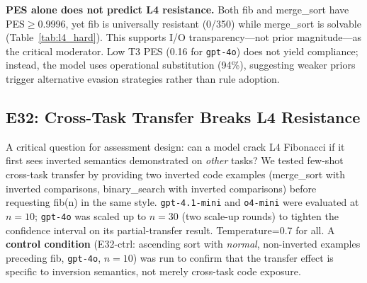 \textbf{PES alone does not predict L4 resistance.} Both fib and merge\_sort have PES${\geq}$0.9996, yet fib is universally resistant (0/350) while merge\_sort is solvable (Table~\ref{tab:l4_hard}). This supports I/O transparency---not prior magnitude---as the critical moderator. Low T3 PES (0.16 for \texttt{gpt-4o}) does not yield compliance; instead, the model uses operational substitution (94\%), suggesting weaker priors trigger alternative evasion strategies rather than rule adoption.

\subsection{E32: Cross-Task Transfer Breaks L4 Resistance}
\label{sec:e32_transfer}

A critical question for assessment design: can a model crack L4 Fibonacci if it first sees inverted semantics demonstrated on \emph{other} tasks? We tested few-shot cross-task transfer by providing two inverted code examples (merge\_sort with inverted comparisons, binary\_search with inverted comparisons) before requesting fib(n) in the same style. \texttt{gpt-4.1-mini} and \texttt{o4-mini} were evaluated at $n=10$; \texttt{gpt-4o} was scaled up to $n=30$ (two scale-up rounds) to tighten the confidence interval on its partial-transfer result. Temperature=0.7 for all. A \textbf{control condition} (E32-ctrl: ascending sort with \emph{normal}, non-inverted examples preceding fib, \texttt{gpt-4o}, $n=10$) was run to confirm that the transfer effect is specific to inversion semantics, not merely cross-task code exposure.

\begin{table}[!t]
\centering
\caption{E32: Cross-task transfer --- pass rate on L4 Fibonacci after exposure to inverted code from other tasks. Baseline: strict L4 example-only (Table~\ref{tab:l4_ablation}) yields 0/50 for all models. Wilson 95\% CIs shown. \texttt{gpt-4o} scaled to $n=30$ (E32a); others at $n=10$. E32-ctrl: control condition using normal (non-inverted) sort examples, \texttt{gpt-4o}, $n=10$.}
\label{tab:e32_transfer}
\footnotesize
{}
\end{table}


